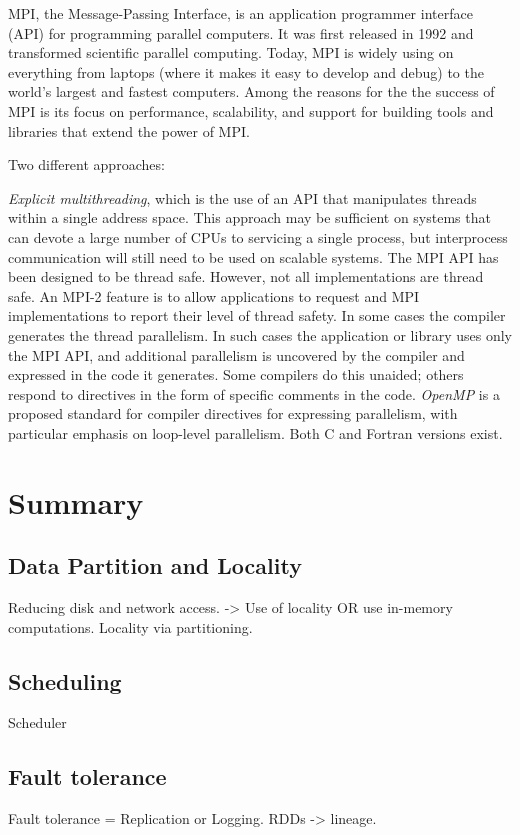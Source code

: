 \documentclass[letterpaper,twocolumn,10pt]{article}
\begin{document}
MPI, the Message-Passing Interface, is an application programmer interface (API) for programming parallel computers. It was first released in 1992 and transformed scientific parallel computing. Today, MPI is widely using on everything from laptops (where it makes it easy to develop and debug) to the world's largest and fastest computers. Among the reasons for the the success of MPI is its focus on performance, scalability, and support for building tools and libraries that extend the power of MPI.

Two different approaches:

\textit{Explicit multithreading}, which is the use of an API that manipulates threads within a single address space. This approach may be sufficient on systems that can devote a large number of CPUs to servicing a single process, but interprocess communication will still need to be used on scalable systems. The MPI API has been designed to be thread safe. However, not all implementations are thread safe. An MPI-2 feature is to allow applications to request and MPI implementations to report their level of thread safety.
In some cases the compiler generates the thread parallelism. In such cases the application or library uses only the MPI API, and additional parallelism is uncovered by the compiler and expressed in the code it generates. Some compilers do this unaided; others respond to directives in the form of specific comments in the code.
\textit{OpenMP} is a proposed standard for compiler directives for expressing parallelism, with particular emphasis on loop-level parallelism. Both C and Fortran versions exist.







\section{Summary}
\subsection{Data Partition and Locality}
	Reducing disk and network access. -> Use of locality OR use in-memory computations.
	Locality via partitioning.
\subsection{Scheduling}
Scheduler
\subsection{Fault tolerance}
Fault tolerance = Replication or Logging. RDDs -> lineage.
\end{document}
